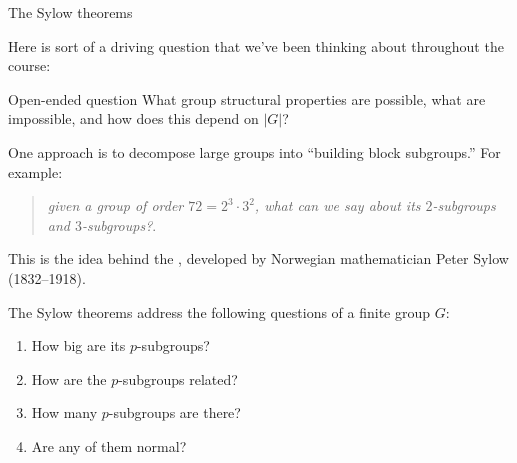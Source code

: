 \documentclass[8pt, handout]{beamer}
\newcommand{\Pause}{\pause}      %
\begin{document}
\begin{frame}{The Sylow theorems} %

  Here is sort of a driving question that we've been thinking about throughout the course: \smallskip
  
  \begin{exampleblock}{Open-ended question}
    What group structural properties are possible, what are
    impossible, and how does this depend on $|G|$?
  \end{exampleblock}

  \smallskip\Pause
  
  One approach is to decompose large groups into ``building block
  subgroups.'' \Pause For example:
  
  \smallskip
  
  \begin{quote}
    \emph{given a group of order $72=2^3\cdot 3^2$, what can we say
      about its $2$-subgroups and $3$-subgroups?}.
  \end{quote}
    
  \smallskip\Pause

  This is the idea behind the , developed by
  Norwegian mathematician Peter Sylow (1832--1918). \medskip\Pause

  The Sylow theorems address the following questions of a finite group $G$:
  
  \smallskip\Pause
  
  \begin{enumerate}
    \item How big are its $p$-subgroups? \smallskip\Pause
    \item How are the $p$-subgroups related? \smallskip\Pause
    \item How many $p$-subgroups are there? \smallskip\Pause
    \item Are any of them normal? 
  \end{enumerate}
  
\end{frame}

\end{document}
